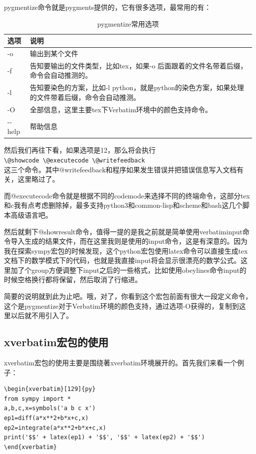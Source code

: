 \documentclass[12pt,oneside]{book}
\begin{document}
\begin{common-format}
pygmentize命令就是pygments提供的，它有很多选项，最常用的有：
\begin{table}[H]
\centering
\label{tab:pygmentize常用选项}
\caption{pygmentize常用选项}
\medskip 
\begin{tabular}{@{}lp{28em}@{}}
\toprule
选项 & 说明  \\ \midrule
-o  & 输出到某个文件  \\
-f  & 告知要输出的文件类型，比如tex，如果-o 后面跟着的文件名带着后缀，命令会自动推测的。 \\
-l & 告知要染色的方案，比如-l python，就是python的染色方案，如果处理的文件带着后缀，命令会自动推测。  \\
-O & 全部信息，这里主要tex下Verbatim环境中的颜色支持命令。 \\
-{}-help  & 帮助信息 \\ \bottomrule
\end{tabular}
\end{table}

然后我们再往下看，如果选项是12，那么将会执行\\
\verb+\@showcode \@executecode \@writefeedback+\\
这三个命令。其中@writefeedback和程序如果发生错误并把错误信息写入文档有关，这里略过了。

而@executecode命令就是根据不同的codemode来选择不同的终端命令，这部分tex和c我有点考虑删除掉，最多支持python3和common-lisp和scheme和bash这几个脚本高级语言吧。

然后就剩下@showresult命令，值得一提的是我之前就是简单使用verbatiminput命令导入生成的结果文件，而在这里我则是使用的input命令，这是有深意的。因为我在探索sympy宏包的时候发现，这个python宏包使用latex命令可以直接生成tex文档下的数学模式下的代码，也就是我直接input将会显示很漂亮的数学公式。这里加了个group方便调整下input之后的一些格式，比如使用obeylines命令input的时候空格换行都将保留，然后取消了行缩进。

简要的说明就到此为止吧。哦，对了，你看到这个宏包前面有很大一段定义命令，这个是pygmentize对于Verbatim环境的颜色支持，通过选项-O获得的，复制到这里以后就不用引入了。


\subsection{xverbatim宏包的使用}
xverbatim宏包的使用主要是围绕著xverbatim环境展开的。首先我们来看一个例子：
\begin{Verbatim}
\begin{xverbatim}[129]{py}
from sympy import *
a,b,c,x=symbols('a b c x') 
ep1=diff(a*x**2+b*x+c,x)
ep2=integrate(a*x**2+b*x+c,x)
print('$$' + latex(ep1) + '$$', '$$' + latex(ep2) + '$$')
\end{xverbatim}
\end{Verbatim}



\end{common-format}
\end{document}
